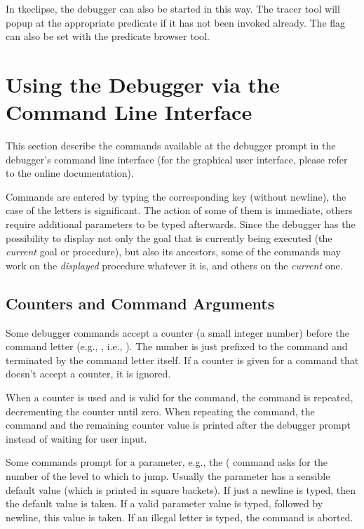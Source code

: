 In tkeclipse, the debugger can also be started in this way. The tracer tool
will popup at the appropriate predicate if it has not been invoked
already. The  flag can also be set with the predicate
browser tool.

\section{Using the Debugger via the Command Line Interface}
This section describe the commands available at the debugger prompt
in the debugger's command line interface (for the graphical user
interface, please refer to the online documentation).

Commands are entered by typing the corresponding key
(without newline), the case of the letters is significant.  The action
of some of them is immediate, others require additional parameters to
be typed afterwards.  Since the {\eclipse} debugger has the possibility to
display not only the goal that is currently being executed (the {\it
current} goal or procedure), but also its ancestors, some of the
commands may work on the \emph{displayed} procedure whatever it is, and
others on the \emph{current} one.

\subsection{Counters and Command Arguments}
Some debugger commands accept a counter (a small integer number)
before the command letter (e.g., , i.e., ).
The number is just prefixed to the command and terminated by the
command letter itself. If a counter is given for a command that
doesn't accept a counter, it is ignored.

When a counter is used and is valid for the command,
the command is repeated, decrementing the counter until zero.
When repeating the command, the command and the remaining counter
value is printed after the debugger prompt instead of waiting for user input.

Some commands prompt for a parameter, e.g., the  (
command asks for the number of the level to which to jump.
Usually the parameter has a sensible default value (which is printed
in square backets). If just a newline is typed, then the default value
is taken. If a valid parameter value is typed, followed by newline,
this value is taken. If an illegal letter is typed, the command is aborted.


